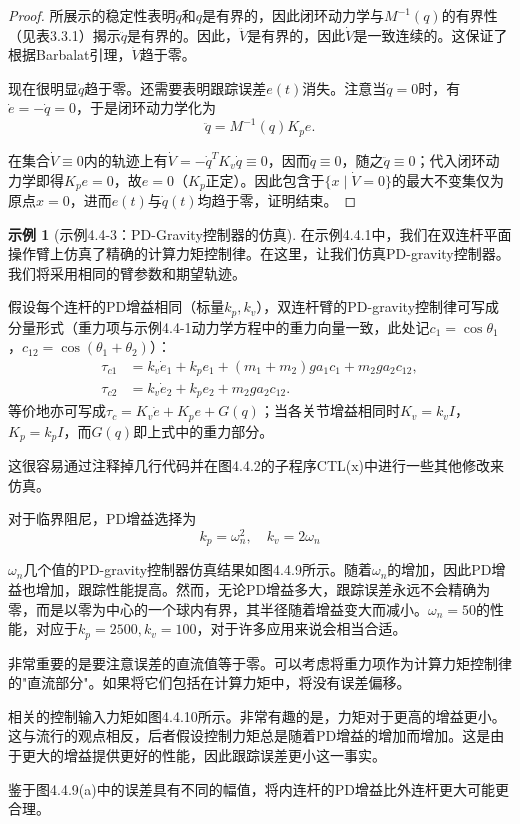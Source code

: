 \documentclass[UTF8]{ctexart}
\theoremstyle{definition}
\newtheorem{example}{示例}[section]
\begin{document}
\begin{proof}
所展示的稳定性表明$\dot{q}$和$q$是有界的，因此闭环动力学与$M^{-1}(q)$的有界性（见表3.3.1）揭示$\ddot{q}$是有界的。因此，$\ddot{V}$是有界的，因此$\dot{V}$是一致连续的。这保证了根据Barbalat引理，$\dot{V}$趋于零。

现在很明显$\dot{q}$趋于零。还需要表明跟踪误差$e(t)$消失。注意当$\dot{q} = 0$时，有$\dot{e}=-\dot{q}=0$，于是闭环动力学化为
\begin{equation*}
    \ddot{q} = M^{-1}(q)K_pe.
\end{equation*}

在集合$\dot{V}\equiv 0$内的轨迹上有$\dot{V}=-\dot{q}^TK_v\dot{q}\equiv 0$，因而$\dot{q}\equiv 0$，随之$\ddot{q}\equiv 0$；代入闭环动力学即得$K_pe=0$，故$e=0$（$K_p$正定）。因此包含于$\{x \mid \dot{V}=0\}$的最大不变集仅为原点$x=0$，进而$e(t)$与$\dot{q}(t)$均趋于零，证明结束。
\end{proof}

\begin{example}[示例4.4-3：PD-Gravity控制器的仿真]
在示例4.4.1中，我们在双连杆平面操作臂上仿真了精确的计算力矩控制律。在这里，让我们仿真PD-gravity控制器。我们将采用相同的臂参数和期望轨迹。

假设每个连杆的PD增益相同（标量$k_p,k_v$），双连杆臂的PD-gravity控制律可写成分量形式（重力项与示例4.4-1动力学方程中的重力向量一致，此处记$c_1=\cos\theta_1$，$c_{12}=\cos(\theta_1+\theta_2)$）：
\begin{align*}
    \tau_{c1} &= k_v\dot{e}_1 + k_pe_1 + (m_1+m_2)ga_1 c_1 + m_2ga_2 c_{12}, \\
    \tau_{c2} &= k_v\dot{e}_2 + k_pe_2 + m_2ga_2 c_{12}.
\end{align*}
等价地亦可写成$\tau_c = K_v\dot{e} + K_pe + G(q)$；当各关节增益相同时$K_v=k_vI$，$K_p=k_pI$，而$G(q)$即上式中的重力部分。

这很容易通过注释掉几行代码并在图4.4.2的子程序CTL(x)中进行一些其他修改来仿真。

对于临界阻尼，PD增益选择为
\begin{equation*}
    k_p = \omega_n^2, \quad k_v = 2\omega_n
\end{equation*}

$\omega_n$几个值的PD-gravity控制器仿真结果如图4.4.9所示。随着$\omega_n$的增加，因此PD增益也增加，跟踪性能提高。然而，无论PD增益多大，跟踪误差永远不会精确为零，而是以零为中心的一个球内有界，其半径随着增益变大而减小。$\omega_n = 50$的性能，对应于$k_p = 2500, k_v = 100$，对于许多应用来说会相当合适。

非常重要的是要注意误差的直流值等于零。可以考虑将重力项作为计算力矩控制律的"直流部分"。如果将它们包括在计算力矩中，将没有误差偏移。

相关的控制输入力矩如图4.4.10所示。非常有趣的是，力矩对于更高的增益更小。这与流行的观点相反，后者假设控制力矩总是随着PD增益的增加而增加。这是由于更大的增益提供更好的性能，因此跟踪误差更小这一事实。

鉴于图4.4.9(a)中的误差具有不同的幅值，将内连杆的PD增益比外连杆更大可能更合理。
\end{example}
\end{document}

